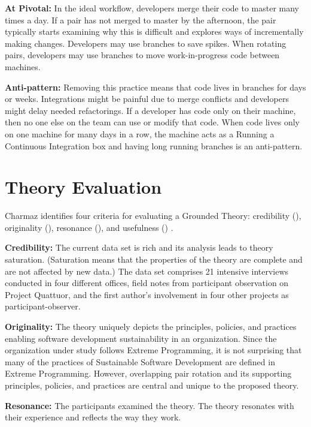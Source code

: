 \textbf{At Pivotal:} In the ideal workflow, developers merge their code to master many times a day. If a pair has not merged to master by the afternoon, the pair typically starts examining why this is difficult and explores ways of incrementally making changes. Developers may use branches to save spikes. When rotating pairs, developers may use branches to move work-in-progress code between machines. 

\textbf{Anti-pattern:} Removing this practice means that code lives in branches for days or weeks. Integrations might be painful due to merge conflicts and developers might delay needed refactorings. If a developer has code only on their machine, then no one else on the team can use or modify that code. When code lives only on one machine for many days in a row, the machine acts as a  Running a Continuous Integration box and having long running branches is an anti-pattern.
\section{Theory Evaluation}
\label{TheoryEvaluation}

Charmaz identifies four criteria for evaluating a Grounded Theory: credibility (), originality (), resonance (), and usefulness () \cite{StolGroundedTheory}. 

\textbf{Credibility:} The current data set is rich and its analysis leads to theory saturation. (Saturation means that the properties of the theory are complete and are not affected by new data.) The data set comprises 21 intensive interviews conducted in four different offices, field notes from participant observation on Project Quattuor, and the first author’s involvement in four other projects as participant-observer.

\textbf{Originality:} The theory uniquely depicts the principles, policies, and practices enabling software development sustainability in an organization. Since the organization under study follows Extreme Programming, it is not surprising that many of the practices of Sustainable Software Development are defined in Extreme Programming. However, overlapping pair rotation and its supporting principles, policies, and practices are central and unique to the proposed theory.

\textbf{Resonance:} The participants examined the theory. The theory resonates with their experience and reflects the way they work.

